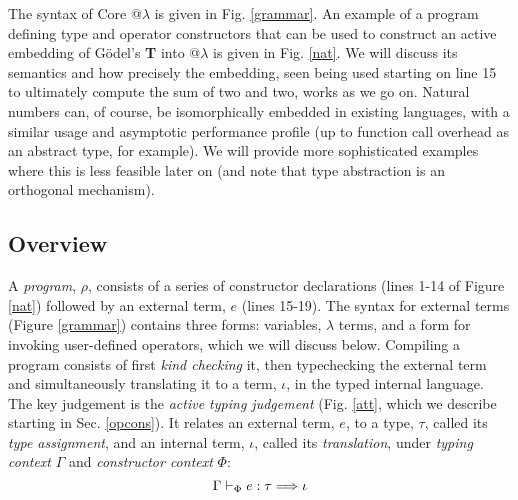 The syntax of Core @$\lambda$ is given in Fig. \ref{grammar}. An example of a program defining type and operator constructors that can be used to construct an active embedding of G\"odel's \textbf{T} into @$\lambda$ is given in Fig. \ref{nat}. We will discuss its semantics and how precisely the embedding, seen being used starting on line 15 to ultimately compute the sum of two and two, works as we go on. Natural numbers can, of course, be isomorphically embedded in existing languages, with a similar usage and asymptotic performance profile (up to function call overhead as an abstract type, for example). We will provide more sophisticated examples where this is less feasible later on (and note that type abstraction is an orthogonal mechanism).

\subsection{Overview}\label{programs}

A \emph{program}, $\rho$, consists of a series of constructor declarations (lines 1-14 of Figure \ref{nat}) followed by an external term, $e$ (lines 15-19). The syntax for external terms (Figure \ref{grammar}) contains three forms: variables, $\lambda$ terms, and a form for invoking user-defined operators, which we will discuss below. Compiling a program consists of first \emph{kind checking} it, then typechecking the external term and simultaneously {translating} it to a term, $\iota$, in the {typed internal language}. 
The key judgement is the \emph{active typing judgement}  (Fig. \ref{att}, which we describe starting in Sec. \ref{opcons}). It relates an external term, $e$, to a {type}, $\tau$, called its \emph{type assignment}, and an internal term, $\iota$, called its \emph{translation}, under \emph{typing context} $\Gamma$ and \emph{constructor context} $\Phi$: 
\[\Gamma \vdash_{\Phi} e : \tau \Longrightarrow \iota\]

